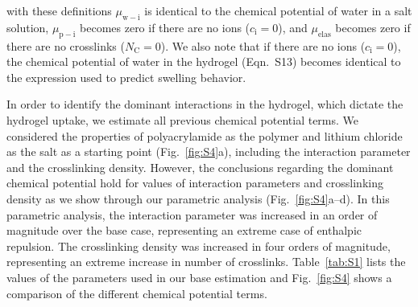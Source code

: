 \documentclass[11pt]{article}
\begin{document}
with these definitions $\mu_\mathrm{w-i}$ is identical to the chemical potential of water in a salt solution,\cite{atkins2006} $\mu_\mathrm{p-i}$ becomes zero if there are no ions ($c_\mathrm{i} = 0$), and $\mu_\mathrm{elas}$ becomes zero if there are no crosslinks ($N_\mathrm{C} = 0$). We also note that if there are no ions ($c_\mathrm{i} = 0$), the chemical potential of water in the hydrogel (Eqn.~S13) becomes identical to the expression used to predict swelling behavior.\cite{bouklas2012}

In order to identify the dominant interactions in the hydrogel, which dictate the hydrogel uptake, we estimate all previous chemical potential terms. We considered the properties of polyacrylamide as the polymer and lithium chloride as the salt as a starting point (Fig.~\ref{fig:S4}a), including the interaction parameter and the crosslinking density.\cite{graeber2023} However, the conclusions regarding the dominant chemical potential hold for values of interaction parameters and crosslinking density as we show through our parametric analysis (Fig.~\ref{fig:S4}a--d). In this parametric analysis, the interaction parameter was increased in an order of magnitude over the base case, representing an extreme case of enthalpic repulsion.\cite{flory1953} The crosslinking density was increased in four orders of magnitude, representing an extreme increase in number of crosslinks.\cite{diazmarin2023ihtc} Table~\ref{tab:S1} lists the values of the parameters used in our base estimation and Fig.~\ref{fig:S4} shows a comparison of the different chemical potential terms.
\end{document}
